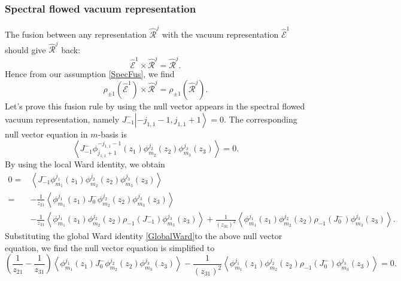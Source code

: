 \documentclass[10pt,a4paper]{article}
\numberwithin{equation}{section}
\newcommand{\ket}[1]{\left| #1 \right\rangle}
\newcommand{\vev}[1]{\left\langle #1 \right\rangle}
\begin{document}
\subsubsection*{Spectral flowed vacuum representation}
The fusion between any representation $\hat{\mathcal{R}}^{j}$ with the vacuum representation $\widehat{\mathcal{E}}^{1}$ should give 
$\hat{\mathcal{R}}^{j}$ back: 
\begin{equation}
    \hat{\mathcal{E}}^{1} \times \hat{\mathcal{R}}^{j} = \hat{\mathcal{R}}^{j}.
\end{equation}
Hence from our assumption \ref{SpecFus}, we find 
\begin{equation}
    \rho_{\pm 1} \left( \hat{\mathcal{E}}^{1} \right) \times \hat{\mathcal{R}}^{j} = \rho_{\pm 1} \left( \hat{\mathcal{R}}^{j} \right).
\end{equation}
Let's prove this fusion rule by using the null vector appears in the spectral flowed vacuum representation, namely 
$J^{-}_{-1}\ket{-j_{1,1}-1,j_{1,1}+1}=0$. The corresponding null vector equation in $m$-basis is 
\begin{equation}
    \vev{J^{-}_{-1} \phi^{-j_{1,1}-1}_{j_{1,1}+1}(z_{1}) \phi^{j_{2}}_{m_{2}}(z_{2}) \phi^{j_{3}}_{m_{3}}(z_{3})} = 0.
\end{equation}
By using the local Ward identity, we obtain
\begin{equation}
    \begin{aligned}
        0 = &\vev{J^{-}_{-1} \phi^{j_{1}}_{m_{1}}(z_{1}) \phi^{j_{2}}_{m_{2}}(z_{2}) \phi^{j_{3}}_{m_{3}}(z_{3})} \\
        =& -\frac{1}{z_{21}} \vev{ \phi^{j_{1}}_{m_{1}}(z_{1}) J^{-}_{0} \phi^{j_{2}}_{m_{2}}(z_{2}) \phi^{j_{3}}_{m_{3}}(z_{3})} \\
        &- \frac{1}{z_{31}} \vev{ \phi^{j_{1}}_{m_{1}}(z_{1}) \phi^{j_{2}}_{m_{2}}(z_{2}) \rho_{-1}\left(J^{-}_{-1}\right) \phi^{j_{3}}_{m_{3}}(z_{3})} 
        + \frac{1}{(z_{31})^{2}} \vev{ \phi^{j_{1}}_{m_{1}}(z_{1}) \phi^{j_{2}}_{m_{2}}(z_{2}) \rho_{-1}\left(J^{-}_{0}\right) \phi^{j_{3}}_{m_{3}}(z_{3})}.
    \end{aligned}
\end{equation}
Substituting the global Ward identity \ref{GlobalWard}to the above null vector equation, 
we find the null vector equation is simplified to 
\begin{equation}
    (\frac{1}{z_{21}}- \frac{1}{z_{31}}) \vev{ \phi^{j_{1}}_{m_{1}}(z_{1}) J^{-}_{0} \phi^{j_{2}}_{m_{2}}(z_{2}) \phi^{j_{3}}_{m_{3}}(z_{3})} - 
    \frac{1}{(z_{31})^{2}} \vev{ \phi^{j_{1}}_{m_{1}}(z_{1}) \phi^{j_{2}}_{m_{2}}(z_{2}) \rho_{-1}\left(J^{-}_{0}\right) \phi^{j_{3}}_{m_{3}}(z_{3})} = 0.
\end{equation}
\end{document}
